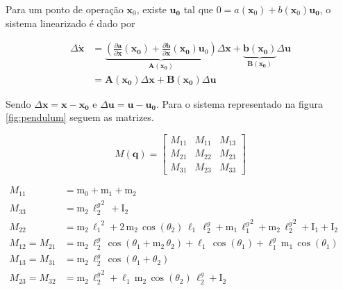 \documentclass[a4paper, twoside]{article}
\begin{document}
    Para um ponto de operação $\mathbf{x}_0$, existe $\mathbf{u_0}$ tal que $0 = a(\mathbf{x}_0) + b(\mathbf{x}_0) \mathbf{u_0}$, o sistema linearizado é dado por 
    
    \begin{equation}
        \begin{aligned}
            \Delta \mathbf{\dot x} &= \underbrace{(\frac{\partial \mathbf{a}}{\partial \mathbf{x}}(\mathbf{x_0}) + \frac{\partial \mathbf{b}}{\partial \mathbf{x}}(\mathbf{x_0}) \mathbf{u}_0)}_{\mathbf{A}(\mathbf{x_0})} \Delta \mathbf{x} + \underbrace{ \mathbf{b}(\mathbf{x_0}) }_{\mathbf{B}(\mathbf{x_0})} \Delta \mathbf{u} \\
            & = \mathbf{A}(\mathbf{x_0}) \Delta \mathbf{x} + \mathbf{B}(\mathbf{x_0}) \Delta \mathbf{u}
        \end{aligned}
    \end{equation}

    
    Sendo $\Delta \mathbf{x} = \mathbf{x} - \mathbf{x_0}$ e $\Delta \mathbf{u} = \mathbf{u} - \mathbf{u_0}$. Para o sistema representado na figura \ref{fig:pendulum} seguem as matrizes.

    \begin{equation}
        M(\mathbf{q}) = 
        \begin{bmatrix}
            M_{11} & M_{11} & M_{13} \\
            M_{21} & M_{22} & M_{23}\\
            M_{31} & M_{23} & M_{33}
        \end{bmatrix}
    \end{equation}

    \begin{equation}
         \begin{aligned}
            M_{11} &= \mathrm{m_0} + \mathrm{m_1} + \mathrm{m_2} \\
            M_{33} &= \mathrm{m_2}\, {\ell_{2}^g}^2\, + \mathrm{I_2} \\
            M_{22} &= \mathrm{m_2}\, {\mathrm{\ell_1}}^2 + 2\, \mathrm{m_2}\, \cos\!\left(\theta_2\right)\, \mathrm{\ell_1}\, \ell_{2}^g + \mathrm{m_1}\, {\ell_{1}^g}^2 + \mathrm{m_2}\, {\ell_{2}^g}^2 + \mathrm{I_1} + \mathrm{I_2} \\
            M_{12} = M_{21} &= \mathrm{m_2}\, \ell_{2}^g\, \cos\!\left(\theta_1 + \mathrm{m_2}\, \theta_2\right) + \mathrm{\ell_1}\, \cos\!\left(\theta_1\right) + \ell_{1}^g\, \mathrm{m_1}\, \cos\!\left(\theta_1\right) \\
            M_{13} = M_{31} &= \mathrm{m_2}\, \ell_{2}^g\, \cos\!\left(\theta_1 + \theta_2\right) \\
            M_{23} = M_{32} &= \mathrm{m_2}\, {\ell_{2}^g}^2 + \mathrm{\ell_1}\, \mathrm{m_2}\, \cos\!\left(\theta_2\right)\, \ell_{2}^g + \mathrm{I_2}
         \end{aligned}
         \phantom{\hspace{6cm}}
    \end{equation}
    
\end{document}
